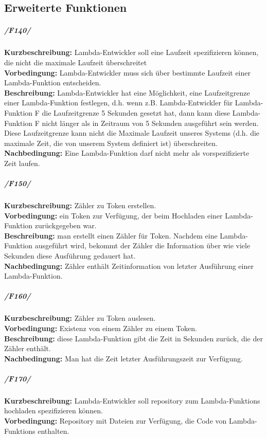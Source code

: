 \documentclass[a4paper,20pt,oneside]{book}
\begin{document}
\subsection{Erweiterte Funktionen}
\iffalse
\subparagraph{/F140/}
\textbf{Kurzbeschreibung:} \gls{Lambda-Entwickler} soll eine Laufzeit spezifizieren können, die nicht die maximale Laufzeit überschreitet
\\
\textbf{Vorbedingung:} \gls{Lambda-Entwickler} muss sich über bestimmte Laufzeit einer \gls{Lambda-Funktion} entscheiden.
\\
\textbf{Beschreibung:} \gls{Lambda-Entwickler} hat eine Möglichkeit, eine Laufzeitgrenze einer \gls{Lambda-Funktion} festlegen, d.h. wenn z.B. \gls{Lambda-Entwickler} für \gls{Lambda-Funktion} F die Laufzeitgrenze 5 Sekunden gesetzt hat, dann kann diese \gls{Lambda-Funktion} F nicht länger als in Zeitraum von 5 Sekunden ausgeführt sein werden. Diese Laufzeitgrenze kann nicht die Maximale Laufzeit unseres Systems (d.h. die maximale Zeit, die von unserem System definiert ist) überschreiten.
\\
\textbf{Nachbedingung:} Eine \gls{Lambda-Funktion} darf nicht mehr als vorspezifizierte Zeit laufen.
\subparagraph{/F150/}
\textbf{Kurzbeschreibung:} Zähler zu \gls{Token} erstellen.
\\
\textbf{Vorbedingung:} ein \gls{Token} zur Verfügung, der beim Hochladen einer \gls{Lambda-Funktion} zurückgegeben war. 
\\
\textbf{Beschreibung:} man erstellt einen Zähler für \gls{Token}. Nachdem eine \gls{Lambda-Funktion} ausgeführt wird, bekommt der Zähler die Information über wie viele Sekunden diese Ausführung gedauert hat.
\\
\textbf{Nachbedingung:} Zähler enthält Zeitinformation von letzter Ausführung einer \gls{Lambda-Funktion}.
\subparagraph{/F160/}
\textbf{Kurzbeschreibung:} Zähler zu \gls{Token} auslesen. 
\\
\textbf{Vorbedingung:} Existenz von einem Zähler zu einem \gls{Token}.
\\
\textbf{Beschreibung:} diese \gls{Lambda-Funktion} gibt die Zeit in Sekunden zurück, die der Zähler enthält. 
\\
\textbf{Nachbedingung:} Man hat die Zeit letzter Ausführungszeit zur Verfügung.
\subparagraph{/F170/}
\textbf{Kurzbeschreibung:} \gls{Lambda-Entwickler} soll repository zum \Glspl{Lambda-Funktion} hochladen spezifizieren können.
\\
\textbf{Vorbedingung:} Repository mit Dateien zur Verfügung, die Code von \Glspl{Lambda-Funktion} enthalten.
\end{document}
